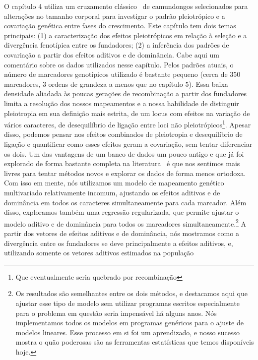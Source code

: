 \begin{refsection}
O capítulo 4 utiliza um cruzamento clássico~\parencite{Cheverud1996-fm} de
camundongos selecionados para alterações no tamanho corporal para investigar o
padrão pleiotrópico e a covariação genética entre fases do crescimento. Este
capítulo tem dois temas principais: (1) a caracterização dos efeitos
pleiotrópicos em relação à seleção e a divergência fenotípica entre os
fundadores; (2) a inferência dos padrões de covariação a partir dos efeitos
aditivos e de dominância. Cabe aqui um comentário sobre os dados utilizados
nesse capítulo. Pelos padrões atuais, o número de marcadores genotípicos
utilizado é bastante pequeno (cerca de 350 marcadores, 3 ordens de grandeza a
menos que no capítulo 5). Essa baixa densidade aliadada às poucas gerações de
recombinação a partir dos fundadores limita a resolução dos nossos mapeamentos
e a nossa habilidade de distinguir pleiotropia em sua definição mais estrita,
de um locus com efeitos na variação de vários caracteres, de desequilíbrio de
ligação entre loci não pleiotrópicos\footnote{Que eventualmente seria quebrado
por recombinação}. Apesar disso, podemos pensar nos efeitos combinados de
pleiotropia e desequilíbrio de ligação e quantificar como esses efeitos geram
a covariação, sem tentar diferenciar os dois. Um das vantagens de um banco de
dados um pouco antigo e que já foi explorado de forma bastante completa na
literatura~\parencite{Cheverud1996-fm, Kramer1998-cc, Hager2009-mz,
Vaughn1999-wt, Leamy2002-nh, Wolf2005-nr, Mitteroecker2016-vq} é
que nos sentimos mais livres para tentar métodos novos e explorar os dados de
forma menos ortodoxa. Com isso em mente, nós utilizamos um modelo de
mapeamento genético multivariado relativamente incomum, ajustando os efeitos
aditivos e de dominância em todos os caracteres simultaneamente para cada
marcador. Além disso, exploramos também uma regressão regularizada, que
permite ajustar o modelo aditivo e de dominância para todos os marcadores
simultaneamente.\footnote{Os resultados são semelhantes entre os dois métodos,
e destacamos aqui que ajustar esse tipo de modelo sem utilizar programas
escritos especialmente para o problema em questão seria impensável há alguns
anos. Nós implementamos todos os modelos em programas genéricos para o ajuste
de modelos lineares. Esse processo em si foi um aprendizado, e nosso sucesso
mostra o quão poderosas são as ferramentas estatísticas que temos disponíveis
hoje.} A partir dos vetores de efeitos aditivos e de dominância, nós mostramos
como a divergência entre os fundadores se deve principalmente a efeitos
aditivos, e, utilizando somente os vetores aditivos estimados na população

\end{refsection}
